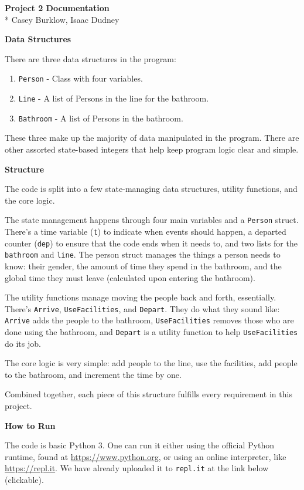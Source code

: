 \documentclass[11pt]{article}
\begin{document}
\noindent
{\Large \textbf{Project 2 Documentation}}\\*
Casey Burklow, Isaac Dudney

\noindent
\textbf{Data Structures}

There are three data structures in the program:

\begin{enumerate}
\item \texttt{Person} - Class with four variables.
\item \texttt{Line} - A list of Persons in the line for the bathroom.
\item \texttt{Bathroom} - A list of Persons in the bathroom.
\end{enumerate}

These three make up the majority of data manipulated in the program.
There are other assorted state-based integers that help keep program logic clear and simple.

\noindent
\textbf{Structure}

The code is split into a few state-managing data structures, utility functions, and the core logic.

The state management happens through four main variables and a \texttt{Person} struct.
There's a time variable (\texttt{t}) to indicate when events should happen, a departed counter (\texttt{dep}) to ensure that the code ends when it needs to, and two lists for the \texttt{bathroom} and \texttt{line}.
The person struct manages the things a person needs to know: their gender, the amount of time they spend in the bathroom, and the global time they must leave (calculated upon entering the bathroom).

The utility functions manage moving the people back and forth, essentially. There's \texttt{Arrive}, \texttt{UseFacilities}, and \texttt{Depart}.
They do what they sound like: \texttt{Arrive} adds the people to the bathroom, \texttt{UseFacilities} removes those who are done using the bathroom, and \texttt{Depart} is a utility function to help \texttt{UseFacilities} do its job.

The core logic is very simple: add people to the line, use the facilities, add people to the bathroom, and increment the time by one.

Combined together, each piece of this structure fulfills every requirement in this project.

\noindent
\textbf{How to Run}

The code is basic Python 3.
One can run it either using the official Python runtime, found at \url{https://www.python.org}, or using an online interpreter, like \url{https://repl.it}.
We have already uploaded it to \texttt{repl.it} at the link below (clickable).
\end{document}
